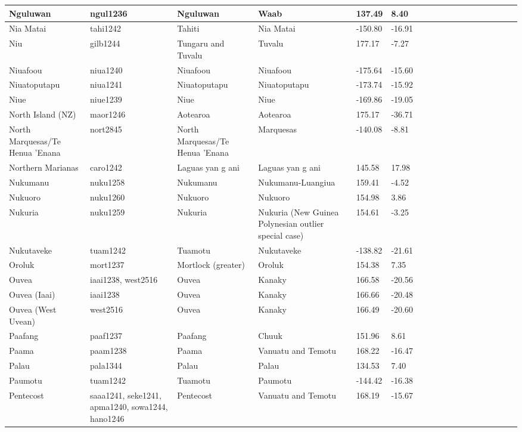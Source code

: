 \documentclass[draft,10pt]{article} %
\begin{document}
\begin{landscape}
\begin{longtable}{| p{2.5cm} |  p{7cm} | p{2.5cm}  | p{2.5cm}  | p{2.5cm}  | p{2.5cm}  | p{2.5cm}  | p{2cm}  | p{1cm} | p{1cm}  | p{1cm} | p{1cm}  | p{1.5cm}  | p{1cm} | p{1cm}  | p{1cm}  |p{1cm}  | p{1cm}    |}
 Nguluwan & ngul1236 & Nguluwan & Waab & 137.49 & 8.40 \\ \hline
 Nia Matai & tahi1242 & Tahiti & Nia Matai & -150.80 & -16.91 \\ \hline
 Niu & gilb1244 & Tungaru and Tuvalu & Tuvalu & 177.17 & -7.27 \\ \hline
 Niuafoou & niua1240 & Niuafoou & Niuafoou & -175.64 & -15.60 \\ \hline
 Niuatoputapu & niua1241 & Niuatoputapu & Niuatoputapu & -173.74 & -15.92 \\ \hline
 Niue & niue1239 & Niue & Niue & -169.86 & -19.05 \\ \hline
 North Island (NZ) & maor1246 & Aotearoa & Aotearoa & 175.17 & -36.71 \\ \hline
 North Marquesas/Te Henua 'Enana & nort2845 & North Marquesas/Te Henua 'Enana & Marquesas & -140.08 & -8.81 \\ \hline
 Northern Marianas & caro1242 & Laguas yan g ani & Laguas yan g ani & 145.58 & 17.98 \\ \hline
 Nukumanu & nuku1258 & Nukumanu & Nukumanu-Luangiua & 159.41 & -4.52 \\ \hline
 Nukuoro & nuku1260 & Nukuoro & Nukuoro & 154.98 & 3.86 \\ \hline
 Nukuria & nuku1259 & Nukuria & Nukuria (New Guinea Polynesian outlier special case) & 154.61 & -3.25 \\ \hline
 Nukutaveke & tuam1242 & Tuamotu & Nukutaveke & -138.82 & -21.61 \\ \hline
 Oroluk & mort1237 & Mortlock (greater) & Oroluk & 154.38 & 7.35 \\ \hline
 Ouvea & iaai1238,  west2516 & Ouvea & Kanaky & 166.58 & -20.56 \\ \hline
 Ouvea (Iaai) & iaai1238 & Ouvea & Kanaky & 166.66 & -20.48 \\ \hline
 Ouvea (West Uvean) & west2516 & Ouvea & Kanaky & 166.49 & -20.60 \\ \hline
 Paafang & paaf1237 & Paafang & Chuuk & 151.96 & 8.61 \\ \hline
 Paama & paam1238 & Paama & Vanuatu and Temotu & 168.22 & -16.47 \\ \hline
 Palau & pala1344 & Palau & Palau & 134.53 & 7.40 \\ \hline
 Paumotu & tuam1242  & Tuamotu & Paumotu & -144.42 & -16.38 \\ \hline
 Pentecost & saaa1241, seke1241, apma1240, sowa1244, hano1246 & Pentecost & Vanuatu and Temotu & 168.19 & -15.67 \\ \hline

\end{longtable}
\end{landscape}
\end{document}
